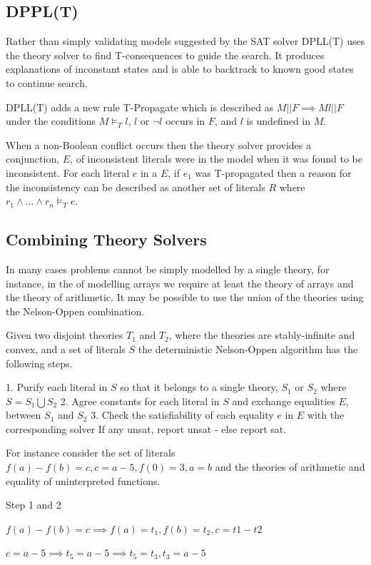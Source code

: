 \documentclass[]{final_report}
\begin{document}
\subsection{DPPL(T)}
Rather than simply validating models suggested by the SAT solver DPLL(T) uses the theory solver to find T-consequences to guide the search. It produces explanations of inconstant states and is able to backtrack to known good states to continue search.

DPLL(T) adds a new rule T-Propagate which is described as $M || F \implies M l || F $ under the conditions $M \models _T l$, $l$ or $\lnot l$ occurs in $F$, and $l$ is undefined in $M$. 

When a non-Boolean conflict occurs then the theory solver provides a conjunction, $E$, of inconsistent literals were in the model when it was found to be inconsistent.  For each literal $e $ in a $E$, if $e_1$ was T-propagated then a reason for the inconsistency can be described as another set of literals $R$ where $r_1 \land ... \land r_n \models _T e$. 

\subsection{Combining Theory Solvers}
In many cases problems cannot be simply modelled by a single theory, for instance, in the of modelling arrays we require at least the theory of arrays and the theory of arithmetic. It may be possible to use the union of the theories using the Nelson-Oppen combination.

Given two disjoint theories $T_1$ and $T_2$, where the theories are stably-infinite and convex, and a set of literals $S$ the deterministic Nelson-Oppen algorithm has the following steps.

1. Purify each literal in $S$ so that it belongs to a single theory, $S_1$ or $S_2$ where $S = S_1 \bigcup S_2$
2. Agree constants for each literal in $S$ and exchange equalities $E$, between $S_1$ and $S_2$
3. Check the satisfiability of each equality $e$ in $E$ with the corresponding solver If any unsat, report unsat - else report sat.

For instance consider the set of literals $f(a) - f(b) = c, c = a -5, f(0) = 3, a = b$ and the theories of arithmetic and equality of uninterpreted functions.

Step 1 and 2

$f(a) - f(b) = c \implies f(a) = t_1, f(b) = t_2, c = t1 - t2$

$c = a - 5 \implies t_5 = a - 5 \implies t_5 = t_3, t_3 = a- 5$
\end{document}
